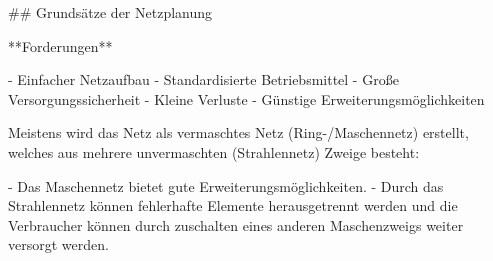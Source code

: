 \begin{markdown}
## Grundsätze der Netzplanung

**Forderungen**

- Einfacher Netzaufbau
- Standardisierte Betriebsmittel
- Große Versorgungssicherheit
- Kleine Verluste
- Günstige Erweiterungsmöglichkeiten

Meistens wird das Netz als vermaschtes Netz (Ring-/Maschennetz) erstellt, welches aus mehrere unvermaschten (Strahlennetz) Zweige besteht:

- Das Maschennetz bietet gute Erweiterungsmöglichkeiten.
- Durch das Strahlennetz können fehlerhafte Elemente herausgetrennt werden und die Verbraucher können durch zuschalten eines anderen Maschenzweigs weiter versorgt werden.

\end{markdown}